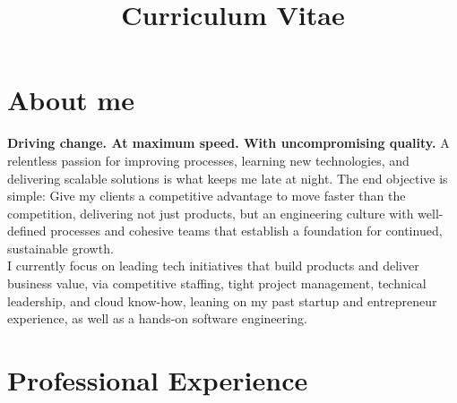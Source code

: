 \documentclass[11pt,a4paper,sans]{moderncv}        %
\title{Curriculum Vitae}                               %
\begin{document}
\makecvtitle

\section{About me}

\textbf{Driving change. At maximum speed. With uncompromising quality.} A relentless passion for improving processes, learning new technologies, and delivering scalable solutions is
what keeps me late at night. The end objective is simple: Give my clients a competitive advantage to move faster than the competition, delivering not just products, but an engineering culture with well-defined processes and cohesive teams that establish a foundation for continued, sustainable growth. \\

I currently focus on leading tech initiatives that build products and deliver business value, via competitive staffing, tight project management, technical leadership, and cloud know-how, leaning on my past startup and entrepreneur experience, as well as a hands-on software engineering.    


\nopagebreak[4]

\section{Professional Experience}

\end{document}
